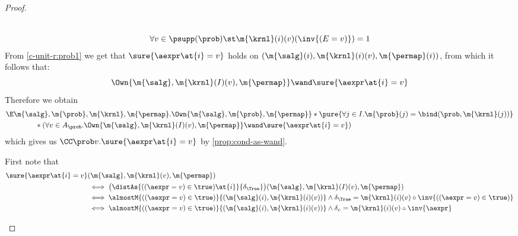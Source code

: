 \documentclass[acmsmall,nonacm,screen,appendix]{acmart}
\begin{document}
\begin{proof}
\begin{casesplit}
\begin{gather}
      \label{c-unit-r:bind}
      \\
      \forall v\in \psupp(\prob)\st
        \m{\krnl}(i)(v)(\inv{(E=v)}) = 1
      \label{c-unit-r:prob1}
    \end{gather}
    From \eqref{c-unit-r:prob1} we get that
    $\sure{\aexpr\at{i} = v}$ holds on
    $(\m{\salg}(i), \m{\krnl}(i)(v), \m{\permap}(i))$,
    from which it follows that:
    \[
      \Own{\m{\salg}, \m{\krnl}(I)(v), \m{\permap}}
      \wand \sure{\aexpr\at{i} = v}
    \]
    Therefore we obtain
    \begin{align*}
      & \E \m{\salg},\m{\prob}, \m{\krnl}, \m{\permap}.
          \Own{\m{\salg},\m{\prob}, \m{\permap}} *
          \pure{\forall j \in I. \m{\prob}(j) = \bind(\prob, \m{\krnl}(j))} \\
      & \qquad \qquad  *
          (
            \forall v \in A_{\prob}.
              \Own{\m{\salg}, \m{\krnl}(I)(v), \m{\permap}}
              \wand \sure{\aexpr\at{i} = v}
          )
    \end{align*}
    which gives us $ \CC\prob v.\sure{\aexpr\at{i} = v} $
    by \cref{prop:cond-as-wand}.

\case*[Backward direction $\CC\prob v.\sure{\aexpr\at{i} = v} \proves \distAs{\aexpr\at{i}}{\prob}$]
    First note that
    \begin{align*}
      \sure{\aexpr\at{i} = v} &(\m{\salg}, \m{\krnl}(v), \m{\permap})
      \\
      &\iff
        \bigl(\distAs{((\aexpr = v) \in \true)\at{i}}{\delta_{\True}}\bigr)
          (\m{\salg}, \m{\krnl}(I)(v), \m{\permap})
      \\
      &\iff
        \almostM{((\aexpr = v) \in \true)}{(\m{\salg}(i), \m{\krnl}(i)(v))}
        \land
        \delta_{\True} =
          \m{\krnl}(i)(v) \circ \inv{((\aexpr = v) \in \true)}
      \\
      &\iff
        \almostM{((\aexpr = v) \in \true)}{(\m{\salg}(i), \m{\krnl}(i)(v))}
        \land
        \delta_{v} = \m{\krnl}(i)(v) \circ \inv{\aexpr}
    \end{align*}


\end{casesplit}
\end{proof}
\end{document}
